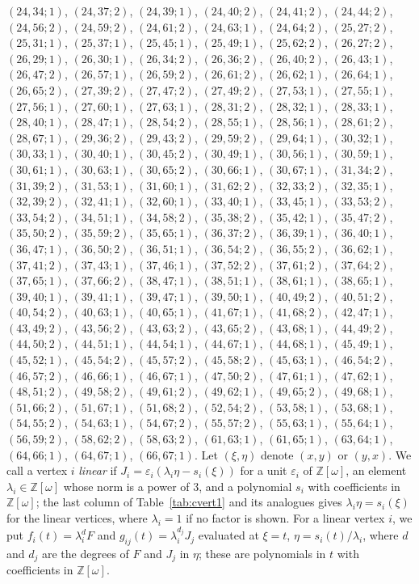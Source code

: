 \documentclass[11pt]{article}
\newcommand{\Z}{\mathbb{Z}}
\begin{document}
$(24,34;1)$, $(24,37;2)$, $(24,39;1)$, $(24,40;2)$, $(24,41;2)$, $(24,44;2)$, $(24,56;2)$, $(24,59;2)$, $(24,61;2)$, $(24,63;1)$, $(24,64;2)$, $(25,27;2)$, $(25,31;1)$, $(25,37;1)$, $(25,45;1)$, $(25,49;1)$, $(25,62;2)$, $(26,27;2)$, $(26,29;1)$, $(26,30;1)$, $(26,34;2)$, $(26,36;2)$, $(26,40;2)$, $(26,43;1)$, $(26,47;2)$, $(26,57;1)$, $(26,59;2)$, $(26,61;2)$, $(26,62;1)$, $(26,64;1)$, $(26,65;2)$, $(27,39;2)$, $(27,47;2)$, $(27,49;2)$, $(27,53;1)$, $(27,55;1)$, $(27,56;1)$, $(27,60;1)$, $(27,63;1)$, $(28,31;2)$, $(28,32;1)$, $(28,33;1)$, $(28,40;1)$, $(28,47;1)$, $(28,54;2)$, $(28,55;1)$, $(28,56;1)$, $(28,61;2)$, $(28,67;1)$, $(29,36;2)$, $(29,43;2)$, $(29,59;2)$, $(29,64;1)$, $(30,32;1)$, $(30,33;1)$, $(30,40;1)$, $(30,45;2)$, $(30,49;1)$, $(30,56;1)$, $(30,59;1)$, $(30,61;1)$, $(30,63;1)$, $(30,65;2)$, $(30,66;1)$, $(30,67;1)$, $(31,34;2)$, $(31,39;2)$, $(31,53;1)$, $(31,60;1)$, $(31,62;2)$, $(32,33;2)$, $(32,35;1)$, $(32,39;2)$, $(32,41;1)$, $(32,60;1)$, $(33,40;1)$, $(33,45;1)$, $(33,53;2)$, $(33,54;2)$, $(34,51;1)$, $(34,58;2)$, $(35,38;2)$, $(35,42;1)$, $(35,47;2)$, $(35,50;2)$, $(35,59;2)$, $(35,65;1)$, $(36,37;2)$, $(36,39;1)$, $(36,40;1)$, $(36,47;1)$, $(36,50;2)$, $(36,51;1)$, $(36,54;2)$, $(36,55;2)$, $(36,62;1)$, $(37,41;2)$, $(37,43;1)$, $(37,46;1)$, $(37,52;2)$, $(37,61;2)$, $(37,64;2)$, $(37,65;1)$, $(37,66;2)$, $(38,47;1)$, $(38,51;1)$, $(38,61;1)$, $(38,65;1)$, $(39,40;1)$, $(39,41;1)$, $(39,47;1)$, $(39,50;1)$, $(40,49;2)$, $(40,51;2)$, $(40,54;2)$, $(40,63;1)$, $(40,65;1)$, $(41,67;1)$, $(41,68;2)$, $(42,47;1)$, $(43,49;2)$, $(43,56;2)$, $(43,63;2)$, $(43,65;2)$, $(43,68;1)$, $(44,49;2)$, $(44,50;2)$, $(44,51;1)$, $(44,54;1)$, $(44,67;1)$, $(44,68;1)$, $(45,49;1)$, $(45,52;1)$, $(45,54;2)$, $(45,57;2)$, $(45,58;2)$, $(45,63;1)$, $(46,54;2)$, $(46,57;2)$, $(46,66;1)$, $(46,67;1)$, $(47,50;2)$, $(47,61;1)$, $(47,62;1)$, $(48,51;2)$, $(49,58;2)$, $(49,61;2)$, $(49,62;1)$, $(49,65;2)$, $(49,68;1)$, $(51,66;2)$, $(51,67;1)$, $(51,68;2)$, $(52,54;2)$, $(53,58;1)$, $(53,68;1)$, $(54,55;2)$, $(54,63;1)$, $(54,67;2)$, $(55,57;2)$, $(55,63;1)$, $(55,64;1)$, $(56,59;2)$, $(58,62;2)$, $(58,63;2)$, $(61,63;1)$, $(61,65;1)$, $(63,64;1)$, $(64,66;1)$, $(64,67;1)$, $(66,67;1)$.
Let $(\xi,\eta)$ denote $(x,y)$ or $(y,x)$. We call a vertex $i$ \emph{linear} if $J_i=\varepsilon_i(\lambda_i\eta-s_i(\xi))$ for a unit $\varepsilon_i$ of $\Z[\omega]$, an element $\lambda_i\in\Z[\omega]$ whose norm is a power of $3$, and a polynomial $s_i$ with coefficients in $\Z[\omega]$; the last column of Table~\ref{tab:cvert1} and its analogues gives $\lambda_i\eta=s_i(\xi)$ for the linear vertices, where $\lambda_i=1$ if no factor is shown. For a linear vertex $i$, we put $f_i(t)=\lambda_i^{d}F$ and $g_{ij}(t)=\lambda_i^{d_j}J_j$ evaluated at $\xi=t$, $\eta=s_i(t)/\lambda_i$, where $d$ and $d_j$ are the degrees of $F$ and $J_j$ in $\eta$; these are polynomials in $t$ with coefficients in $\Z[\omega]$.
\end{document}
